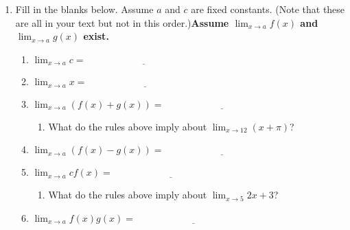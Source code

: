\documentclass[11pt,fleqn]{article}
\begin{document}
\setlength{\parindent}{0cm}
\renewcommand{\headrulewidth}{0pt}
\newcommand{\blank}[1]{\rule{#1}{0.75pt}}
\renewcommand{\d}{\displaystyle}


\vspace*{-1in}
\begin{center}
\end{center}
\begin{enumerate}
\item Fill in the blanks below. Assume $a$ and $c$ are fixed constants. (Note that these are all in your text but not in this order.)\textbf{Assume $\d \lim_{x \to a} f(x) $ and $\d \lim_{x \to a} g(x) $ exist. }
	\begin{enumerate}
	
	\item $\d \lim_{x \to a} c = \underline{\hspace{2in}} $ \\ \vfill
	
	\item $\d \lim_{x \to a} x = \underline{\hspace{2in}} $ \\ \vfill

	\item $\d \lim_{x \to a} \left(f(x) + g(x) \right) = \underline{\hspace{2in}} $ \\ \vfill
	
	\begin{enumerate} \item What do the rules above imply about $\d \lim_{x \to 12} (x+\pi)$? \end{enumerate} 
	 \vfill

	 \item $\d \lim_{x \to a} \left(f(x) - g(x) \right) = \underline{\hspace{2in}}$ \\ \vfill
	 
	  \item $\d \lim_{x \to a} cf(x) = \underline{\hspace{2in}}$ \\ \vfill
	  
	  \begin{enumerate} \item What do the rules above imply about $\d \lim_{x \to 5} 2x+3$? \end{enumerate}  \vfill
	  
	  \item $\d \lim_{x \to a} f(x)g(x)= \underline{\hspace{2in}}$ \\ \vfill
	  

\end{enumerate}
\end{enumerate}
\end{document}
